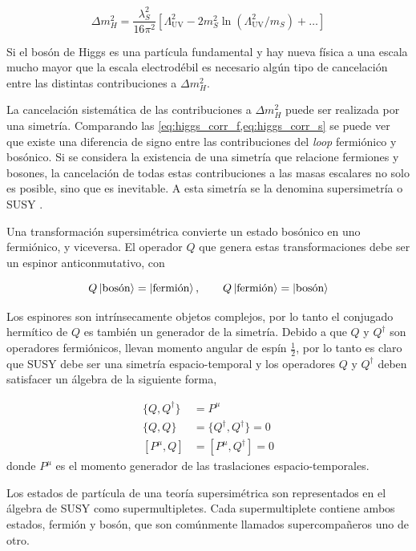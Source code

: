 \begin{equation}
  \Delta m_H^2 = \frac{\lambda_S^2}{16\pi^2} \left[ \Lambda^2_\text{UV} - 2
    m_S^2 \ln (\Lambda^2_\text{UV}/m_S) + \ldots \right]
  \label{eq:higgs_corr_s}
\end{equation}

Si el bosón de Higgs es una partícula fundamental y hay nueva física a una escala
mucho mayor que la escala electrodébil
es necesario algún tipo de cancelación entre las
distintas contribuciones a $\Delta m_H^2$.

La cancelación sistemática de las contribuciones a $\Delta m_H^2$ puede ser
realizada por una simetría. Comparando las
\cref{eq:higgs_corr_f,eq:higgs_corr_s} se puede ver que existe una diferencia de
signo entre las contribuciones del \emph{loop} fermiónico y bosónico. Si se
considera la existencia de una simetría que relacione fermiones y bosones, la
cancelación de todas estas contribuciones a las masas escalares no solo es
posible, sino que es inevitable. A esta simetría se la denomina supersimetría o
SUSY \cite{Martin:1997ns}.

Una transformación supersimétrica convierte un estado bosónico en uno
fermiónico, y viceversa. El operador $Q$ que genera estas transformaciones debe
ser un espinor anticonmutativo, con

\begin{equation}
  Q \left| \text{bosón} \right> = \left| \text{fermión} \right>, \quad \quad Q \left| \text{fermión} \right> = \left| \text{bosón} \right>
\end{equation}

Los espinores son intrínsecamente objetos complejos, por lo tanto el conjugado
hermítico de $Q$ es también un generador de la simetría. Debido a que $Q$ y
$Q^\dagger$ son operadores fermiónicos, llevan momento angular de espín $\frac{1}{2}$, por
lo tanto es claro que SUSY debe ser una simetría espacio-temporal y los
operadores $Q$ y $Q^\dagger$ deben satisfacer un álgebra de la siguiente forma,

\begin{align}
  \{Q, Q^\dagger\} &= P^\mu \\
  \{Q, Q\} &= \{Q^\dagger, Q^\dagger\} = 0 \\
  [P^\mu, Q] &= [P^\mu, Q^\dagger] = 0
\end{align}
%
donde $P^\mu$ es el momento generador de las traslaciones
espacio-temporales.

Los estados de partícula de una teoría supersimétrica son representados en el
álgebra de SUSY como supermultipletes. Cada supermultiplete contiene
ambos estados, fermión y bosón, que son comúnmente llamados supercompa\~neros
uno de otro.

